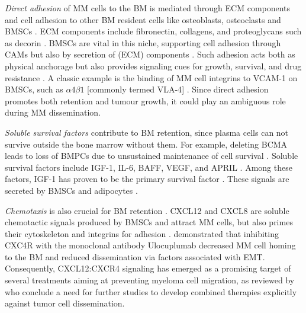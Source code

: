 \emph{Direct adhesion} of \ac{MM} cells to the \ac{BM} is mediated through
\ac{ECM} components and cell adhesion to other \ac{BM} resident cells like
osteoblasts, osteoclasts and \acp{BMSC} \cite{teohINTERACTIONTUMORHOST1997,
    bouzerdanAdhesionMoleculesMultiple2022}. \ac{ECM} components include
fibronectin, collagens, and proteoglycans such as decorin
\cite{huDecorinmediatedSuppressionTumorigenesis2021,
    huangHigherDecorinLevels2015, katzAdhesionMoleculesLifelines2010,
    kiblerAdhesiveInteractionsHuman1998}. \acp{BMSC} are vital in this niche,
supporting cell adhesion through \acp{CAM} but also by secretion of (\ac{ECM})
components \cite{katzAdhesionMoleculesLifelines2010}. Such adhesion acts both as
physical anchorage but also provides signaling cues for growth, survival, and
drug resistance \cite{chenContributionBoneMarrow2020}. A classic example is the
binding of \ac{MM} cell integrins to \ac{VCAM-1} on \acp{BMSC}, such as $\alpha4\beta1$ [commonly termed \ac{VLA-4}]
\cite{bouzerdanAdhesionMoleculesMultiple2022}. Since direct adhesion promotes
both retention and tumour growth, it could play an ambiguous role during \ac{MM}
dissemination.

\emph{Soluble survival factors} contribute to \ac{BM} retention, since plasma
cells can not survive outside the bone marrow without them. For example,
deleting BCMA  leads to loss of
\acp{BMPC}  due to unsustained maintenance of cell survival
\cite{oconnorBCMAEssentialSurvival2004}. Soluble survival factors include
\ac{IGF-1}, \ac{IL-6}, \ac{BAFF}, \ac{VEGF}, and \ac{APRIL} . Among these factors, IGF-1 has proven to be the primary
survival factor \cite{sprynskiRoleIGF1Major2009}. These signals are secreted by
\acp{BMSC} and adipocytes \cite{kiblerAdhesiveInteractionsHuman1998,
    garcia-ortizRoleTumorMicroenvironment2021}.

\emph{Chemotaxis} is also crucial for \ac{BM} retention
\cite{ullahRoleCXCR4Multiple2019}. \ac{CXCL12} 
and CXCL8 are soluble chemotactic signals produced by \acp{BMSC} and attract
\ac{MM} cells, but also primes their cytoskeleton and integrins for adhesion
\cite{aggarwalChemokinesMultipleMyeloma2006,
    alsayedMechanismsRegulationCXCR42007}.
\citet{roccaroCXCR4RegulatesExtraMedullary2015} demonstrated that inhibiting
CXC4R  with the monoclonal antibody
Ulocuplumab decreased \ac{MM} cell homing to the \ac{BM} and reduced
dissemination via factors associated with \ac{EMT}. Consequently, CXCL12:CXCR4
signaling has emerged as a promising target of several treatments aiming at
preventing myeloma cell migration, as reviewed by
\citet{itoRoleTherapeuticTargeting2021} who conclude a need for further studies
to develop combined therapies explicitly against tumor cell dissemination.

